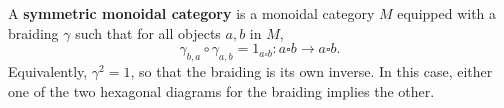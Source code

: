 A \textbf{symmetric monoidal category} is a monoidal category $M$ equipped with a braiding $\gamma$ such that for all objects $a, b$ in $M$,
$$\gamma_{b,a} \circ \gamma_{a,b} = 1_{a \square b} : a \square b \to a \square b.$$
Equivalently, $\gamma^2 = 1$, so that the braiding is its own inverse. In this case, either one of the two hexagonal diagrams for the braiding implies the other.
